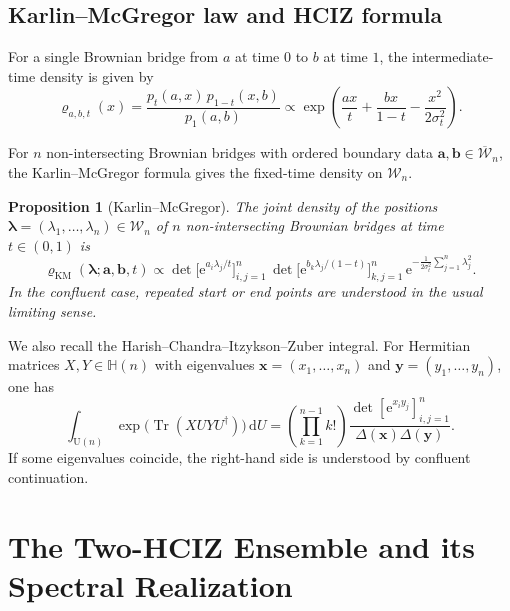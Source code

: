 \documentclass[11pt,a4paper]{article}
\newtheorem{proposition}[theorem]{Proposition}
\theoremstyle{definition}\newtheorem{definition}[theorem]{Definition}
\theoremstyle{remark}\newtheorem{remark}[theorem]{Remark}
\numberwithin{equation}{section}
\DeclareMathOperator{\Tr}{Tr}
\newcommand{\e}{\mathrm{e}}
\newcommand{\dd}{\mathrm{d}}
\newcommand{\HH}{\mathbb{H}(n)}
\newcommand{\UU}{\mathrm{U}(n)}
\begin{document}
\subsection{Karlin--McGregor law and HCIZ formula}
 

For a single Brownian bridge from $a$ at time $0$ to $b$ at time $1$, the
intermediate-time density is given by 
\begin{equation}
\varrho_{a,b,t}(x)=\frac{p_t(a,x)\,p_{1-t}(x,b)}{p_1(a,b)}
\propto
\exp\!\left(\frac{ax}{t}+\frac{bx}{1-t}-\frac{x^2}{2\sigma_t^2}\right).
\end{equation}
 

For $n$ non-intersecting Brownian bridges with ordered boundary data
$\bm a,\bm b\in\overline{\mathcal W}_n$, the Karlin--McGregor formula gives the
fixed-time density on $\mathcal W_n$.

\begin{proposition}[Karlin--McGregor]
The joint density of the positions
$\bm\lambda=(\lambda_1,\dots,\lambda_n)\in \mathcal W_n$ of $n$ non-intersecting
Brownian bridges at time $t\in(0,1)$ is
\begin{equation}
\label{eq:KM-reduced}
\varrho_{\mathrm{KM}}(\bm\lambda;\bm a,\bm b,t)
\propto
\det\!\bigl[\e^{a_i\lambda_j/t}\bigr]_{i,j=1}^n\,
\det\!\bigl[\e^{b_k\lambda_j/(1-t)}\bigr]_{k,j=1}^n\,
\e^{-\frac{1}{2\sigma_t^2}\sum_{j=1}^n\lambda_j^2}.
\end{equation}
In the confluent case, repeated start or end points are
understood in the usual limiting sense.
\end{proposition}

We also recall the Harish--Chandra--Itzykson--Zuber \cite{HarishChandra1957,ItzyksonZuber1980} integral. For Hermitian
matrices $X,Y\in\HH$ with eigenvalues
$\bm x=(x_1,\dots,x_n)$ and $\bm y=(y_1,\dots,y_n)$, one has
\begin{equation}
\int_{\UU}\exp\!\big(\Tr(XUYU^\dagger)\big)\,\dd U
=
\left(\prod_{k=1}^{n-1}k!\right)
\frac{\det[\e^{x_i y_j}]_{i,j=1}^n}{\Delta(\bm x)\Delta(\bm y)}.
\end{equation}
If some eigenvalues coincide, the right-hand side is understood by confluent continuation.
 




\section{The Two-HCIZ Ensemble and its Spectral Realization}
\label{sec:spectral-realization}
\end{document}
